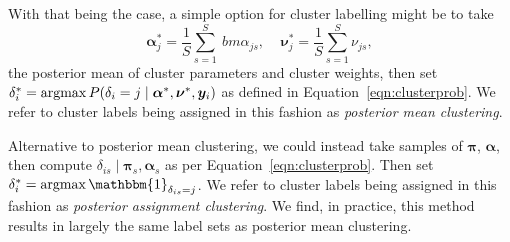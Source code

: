 With that being the case, a simple option for cluster labelling might be to take
    \[
        \bm{\alpha}_j^* = \frac{1}{S}\sum_{s = 1}^S\ bm{\alpha}_{js},\;\;\;\;
        \bm{\nu}_j^* = \frac{1}{S}\sum_{s = 1}^S \nu_{js},
    \]
    the posterior mean of cluster parameters and cluster weights, then set
    $\delta_i^{*} = \operatorname*{argmax} P(\delta_i = j\mid\bm{\alpha}^*,\bm{\nu}^*,\bm{y}_i)$
    as defined in Equation~\eqref{eqn:clusterprob}. We refer to cluster labels
    being assigned in this fashion as \emph{posterior mean clustering}.

Alternative to posterior mean clustering, we could instead take samples of 
    $\bm{\pi}$, $\bm{\alpha}$, then compute 
    $\delta_{is}\mid\bm{\pi}_s,\bm{\alpha}_s$
    as per Equation~\eqref{eqn:clusterprob}.  Then set 
    $\delta_i^{*} = \argmax \mathbbm{1}_{\delta_{is} = j}$.
    We refer to cluster labels being assigned in this fashion as
    \emph{posterior assignment clustering}.  We find, in practice, this method
    results in largely the same label sets as posterior mean clustering.
























